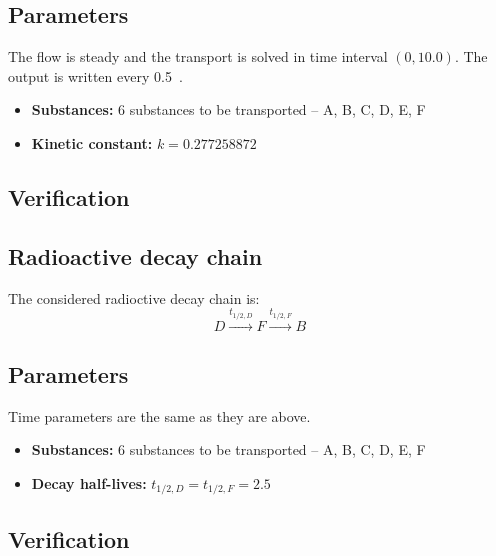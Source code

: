\subsection*{Parameters}
The flow is steady and the transport is solved in time interval $(0,10.0)$. The output is written every 0.5~.  
\begin{itemize}
  \item \textbf{Substances:} 6 substances to be transported -- A, B, C, D, E, F
  \item \textbf{Kinetic constant:} $k = 0.277258872$
\end{itemize}

\subsection*{Verification}

\subsection{Radioactive decay chain}
The considered radioctive decay chain is:
\[
 D\xrightarrow{t_{1/2,D}}F\xrightarrow{t_{1/2,F}}B
\]
\subsection*{Parameters}
Time parameters are the same as they are above.
\begin{itemize}
  \item \textbf{Substances:} 6 substances to be transported -- A, B, C, D, E, F
  \item \textbf{Decay half-lives:} $t_{1/2,D} = t_{1/2,F} = 2.5$
\end{itemize}

\subsection*{Verification}


